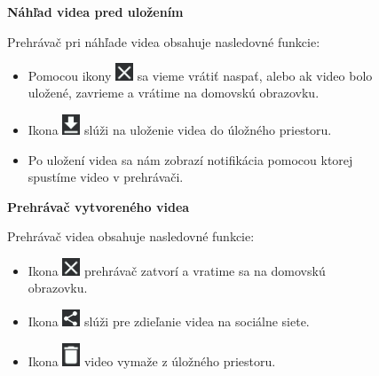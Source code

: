 \documentclass[12pt, oneside]{book}
\begin{document}
\begin{figure}[H]

    \hspace{15pt} \textbf{Náhľad videa pred uložením}

\vspace{10pt}
\hspace{15pt} Prehrávač pri náhľade videa obsahuje nasledovné funkcie: 
 \begin{itemize}
        \item Pomocou ikony \includegraphics[width=0.05\textwidth]{images/close.png} sa vieme vrátiť naspať, alebo ak video bolo uložené, zavrieme a vrátime na domovskú obrazovku.
        \item Ikona \includegraphics[width=0.05\textwidth]{images/save.png} slúži na uloženie videa do úložného priestoru.
        \item Po uložení videa sa nám zobrazí notifikácia pomocou ktorej spustíme video v prehrávači.
        
    \end{itemize} 
   
\end{figure}

\begin{figure}[H]

    \hspace{15pt} \textbf{Prehrávač vytvoreného videa}
    
    \vspace{10pt}
    
\hspace{15pt} Prehrávač videa obsahuje nasledovné funkcie: 
 \begin{itemize}
        \item Ikona \includegraphics[width=0.05\textwidth]{images/close.png} prehrávač zatvorí a vratime sa na domovskú obrazovku.
        \item Ikona \includegraphics[width=0.05\textwidth]{images/share.png} slúži pre zdieľanie videa na sociálne siete.
        \item Ikona \includegraphics[width=0.05\textwidth]{images/delete.png} video vymaže z úložného priestoru.
        
    \end{itemize}

   
\end{figure}
\end{document}
